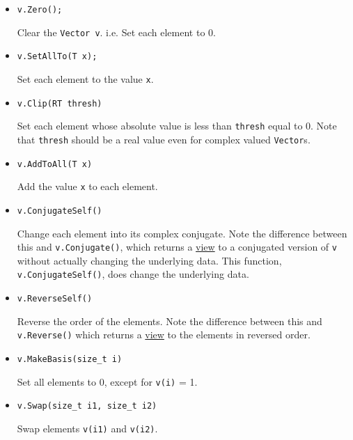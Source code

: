 \documentclass[twoside,letterpaper,11pt]{article}
\renewcommand{\tt}[1]{{\texttt {#1}}}
\begin{document}
\begin{itemize}

\item
\begin{verbatim}
v.Zero();
\end{verbatim}
Clear the \tt{Vector v}.  i.e. Set each element to 0.

\item
\begin{verbatim}
v.SetAllTo(T x);
\end{verbatim}
Set each element to the value \tt{x}.

\item
\begin{verbatim}
v.Clip(RT thresh)
\end{verbatim}
Set each element whose absolute value is less than \tt{thresh} equal to 0.
Note that \tt{thresh} should be a real value even for complex valued
\tt{Vector}s.

\item
\begin{verbatim}
v.AddToAll(T x)
\end{verbatim}
Add the value \tt{x} to each element.

\item 
\begin{verbatim}
v.ConjugateSelf()
\end{verbatim}
Change each element into its complex conjugate.  
Note the difference between this and \tt{v.Conjugate()}, 
which returns a \underline{view} to a conjugated version of \tt{v} without
actually changing the underlying data.  This function, \tt{v.ConjugateSelf()},
does change the underlying data.

\item
\begin{verbatim}
v.ReverseSelf()
\end{verbatim}
Reverse the order of the elements.  Note the difference between this and 
\tt{v.Reverse()} which returns a \underline{view} to the elements in 
reversed order.

\item
\begin{verbatim}
v.MakeBasis(size_t i)
\end{verbatim}
Set all elements to 0, except for \tt{v(i)} = 1.

\item
\begin{verbatim}
v.Swap(size_t i1, size_t i2)
\end{verbatim}
Swap elements \tt{v(i1)} and \tt{v(i2)}.


\end{itemize}
\end{document}
